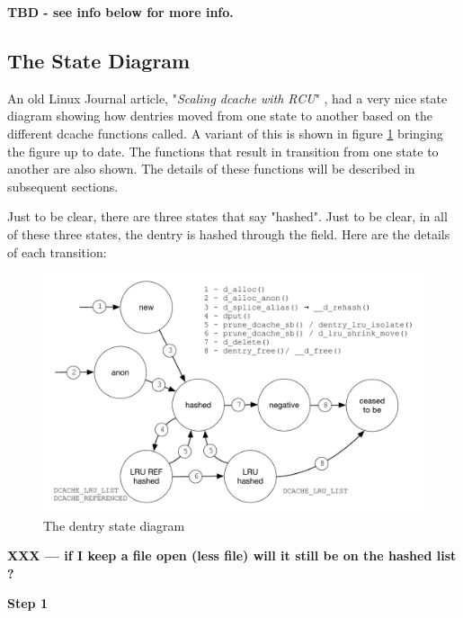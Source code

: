 \noindent
\textbf{TBD - see  info below for more info.}


\subsection{The  State Diagram}

An old Linux Journal article, "\textit{Scaling dcache with RCU}" \cite{mckenney}, had a very nice state diagram showing how dentries moved from one state to another based on the different dcache functions called. A variant of this is shown in figure \ref{fig:dcache-state} bringing the figure up to date. The functions that result in transition from one state to another are also shown. The details of these functions will be described in subsequent sections.

Just to be clear, there are three states that say "hashed". Just to be clear, in all of these three states, the dentry is hashed through the  field. Here are the details of each transition:

\begin{figure}[h]
	\includegraphics[scale=0.7]{figures/dcache-state.pdf}
	\centering
	\caption{The dentry state diagram}
	\label{fig:dcache-state}
\end{figure}

\textbf{XXX --- if I keep a file open (less file) will it still be on the hashed list ?}

\vspace{0.25cm}
\noindent
\textbf{Step 1}  %

